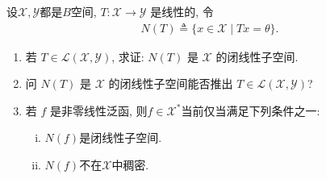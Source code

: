 \documentclass[../../main.tex]{subfiles}%
\begin{document}
\begin{proposition}\label{proposition:泛函分析--命题1.1231.31.3}
设$\mathscr{X},\mathscr{Y}$都是$B$空间, $T: \mathscr{X} \to \mathscr{Y}$ 是线性的, 令
\begin{align*}
N(T) \triangleq \{x \in \mathscr{X} \mid Tx = \theta\}.
\end{align*}
\begin{enumerate}[(1)]
\item\label{proposition:泛函分析--命题1.1231.31.3-1} 若 $T \in \mathscr{L}(\mathscr{X},\mathscr{Y})$, 求证: $N(T)$ 是 $\mathscr{X}$ 的闭线性子空间.

\item\label{proposition:泛函分析--命题1.1231.31.3-2} 问 $N(T)$ 是 $\mathscr{X}$ 的闭线性子空间能否推出 $T \in \mathscr{L}(\mathscr{X},\mathscr{Y})$?

\item\label{proposition:泛函分析--命题1.1231.31.3-3} 若 $f$ 是非零线性泛函, 则$f \in \mathscr{X}^*$当前仅当满足下列条件之一:
\begin{enumerate}[(i)]
\item $N(f)$是闭线性子空间.

\item $N(f)$不在$\mathscr{X}$中稠密.
\end{enumerate}
\end{enumerate}
\end{proposition}
\end{document}
